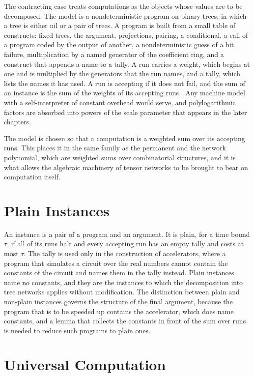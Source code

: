 \documentclass[11pt,letterpaper]{report}
\theoremstyle{plain}
\theoremstyle{definition}
\theoremstyle{remark}
\begin{document}
The contracting case treats computations as the objects whose values are to be decomposed. The model is a nondeterministic program on binary trees, in which a tree is either nil or a pair of trees. A program is built from a small table of constructs: fixed trees, the argument, projections, pairing, a conditional, a call of a program coded by the output of another, a nondeterministic guess of a bit, failure, multiplication by a named generator of the coefficient ring, and a construct that appends a name to a tally. A run carries a weight, which begins at one and is multiplied by the generators that the run names, and a tally, which lists the names it has used. A run is accepting if it does not fail, and the sum of an instance is the sum of the weights of its accepting runs \cite{Source2026}. Any machine model with a self-interpreter of constant overhead would serve, and polylogarithmic factors are absorbed into powers of the scale parameter that appears in the later chapters.

The model is chosen so that a computation is a weighted sum over its accepting runs. This places it in the same family as the permanent and the network polynomial, which are weighted sums over combinatorial structures, and it is what allows the algebraic machinery of tensor networks to be brought to bear on computation itself.

\section{Plain Instances}

An instance is a pair of a program and an argument. It is plain, for a time bound $\tau$, if all of its runs halt and every accepting run has an empty tally and costs at most $\tau$. The tally is used only in the construction of accelerators, where a program that simulates a circuit over the real numbers cannot contain the constants of the circuit and names them in the tally instead. Plain instances name no constants, and they are the instances to which the decomposition into tree networks applies without modification. The distinction between plain and non-plain instances governs the structure of the final argument, because the program that is to be speeded up contains the accelerator, which does name constants, and a lemma that collects the constants in front of the sum over runs is needed to reduce such programs to plain ones.

\section{Universal Computation}
\end{document}
